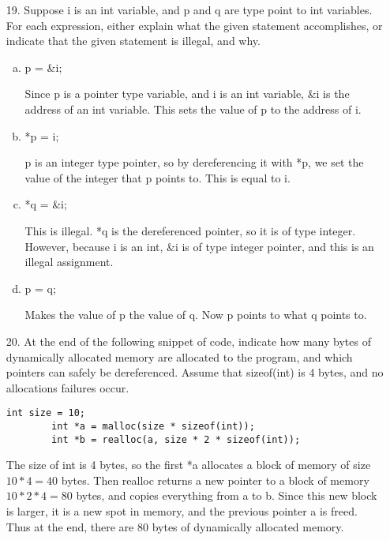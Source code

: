 \documentclass{article}
\begin{document}
\begin{itemize}
	\item[19.] Suppose i is an int variable, and p and q are type point to int variables. For each expression, either explain what the given statement accomplishes, or indicate that the given statement is illegal, and why.

		\begin{enumerate}[(a)]
			\item p = \&i;
				\begin{answer*}
					Since p is a pointer type variable, and i is an int variable, \&i is the address of an int variable. This sets the value of p to the address of i.
				\end{answer*}

			\item *p = i;
				\begin{answer*}
					p is an integer type pointer, so by dereferencing it with *p, we set the value of the integer that p points to. This is equal to i.
				\end{answer*}

			\item *q = \&i;
				\begin{answer*}
					This is illegal. *q is the dereferenced pointer, so it is of type integer. However, because i is an int, \&i is of type integer pointer, and this is an illegal assignment.
				\end{answer*}

			\item p = q;
				\begin{answer*}
					Makes the value of p the value of q. Now p points to what q points to.
				\end{answer*}

		\end{enumerate}

	\item[20.] At the end of the following snippet of code, indicate how many bytes of dynamically allocated memory are allocated to the program, and which pointers can safely be dereferenced. Assume that sizeof(int) is 4 bytes, and no allocations failures occur.

		\begin{lstlisting}[style=nonumbers]
		int size = 10;
		int *a = malloc(size * sizeof(int));
		int *b = realloc(a, size * 2 * sizeof(int));
		\end{lstlisting}
		\begin{answer*}
			The size of int is 4 bytes, so the first *a allocates a block of memory of size $10*4=40$ bytes. Then realloc returns a new pointer to a block of memory $10*2*4=80$ bytes, and copies everything from a to b. Since this new block is larger, it is a new spot in memory, and the previous pointer a is freed. Thus at the end, there are 80 bytes of dynamically allocated memory.
		\end{answer*}
		

\end{itemize}
\end{document}
